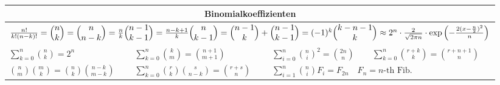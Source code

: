 \begin{tabularx}{\linewidth}{|XXXX|}
	\hline
	\multicolumn{4}{|c|}{Binomialkoeffizienten} \\
	\hline
	\multicolumn{4}{|c|}{
	$\frac{n!}{k!(n - k)!} \hfill=\hfill
	\binom{n}{k} \hfill=\hfill
	\binom{n}{n - k} \hfill=\hfill
	\frac{n}{k}\binom{n - 1}{k - 1} \hfill=\hfill
	\frac{n-k+1}{k}\binom{n}{k - 1} \hfill=\hfill
	\binom{n - 1}{k} + \binom{n - 1}{k - 1} \hfill=\hfill
	(-1)^k \binom{k - n - 1}{k} \hfill\approx\hfill
	2^{n} \cdot \frac{2}{\sqrt{2\pi n}}\cdot\exp\left(-\frac{2(x - \frac{n}{2})^2}{n}\right)$
	} \\
	\grayhline
	
	$\sum\limits_{k = 0}^n \binom{n}{k} = 2^n$ &
	$\sum\limits_{k = 0}^n \binom{k}{m} = \binom{n + 1}{m + 1}$ &
	$\sum\limits_{i = 0}^n \binom{n}{i}^2 = \binom{2n}{n}$ &
	$\sum\limits_{k = 0}^n\binom{r + k}{k} = \binom{r + n + 1}{n}$\\
	
	$\binom{n}{m}\binom{m}{k} = \binom{n}{k}\binom{n - k}{m - k}$ &
	$\sum\limits_{k = 0}^n \binom{r}{k}\binom{s}{n - k} = \binom{r + s}{n}$ &
	\multicolumn{2}{l|}{
	$\sum\limits_{i = 1}^n \binom{n}{i} F_i = F_{2n} \quad F_n = n\text{-th Fib.}$
	}\\
	\hline
\end{tabularx}

